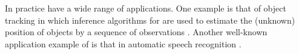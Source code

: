 In practice  have a wide range of applications. One example is that of object tracking in which inference algorithms for  are used to estimate the (unknown) position of objects by a sequence of observations \cite{caelli2001shape}. Another well-known application example of  is that in automatic speech recognition \cite{rabiner1989tutorial}. %


%

